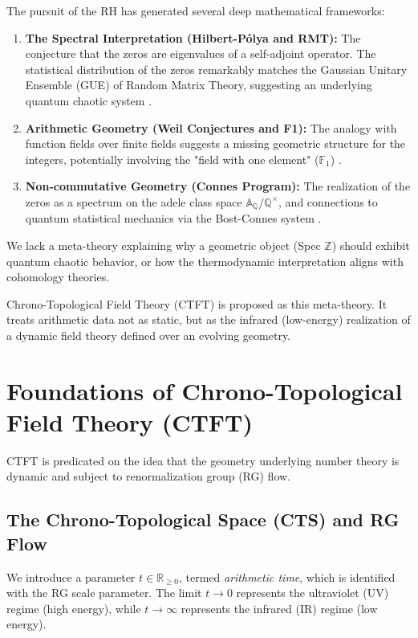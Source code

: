 \documentclass[11pt, a4paper]{article}
\theoremstyle{definition}
\newcommand{\Z}{\mathbb{Z}}
\newcommand{\Q}{\mathbb{Q}}
\newcommand{\R}{\mathbb{R}}
\newcommand{\A}{\mathbb{A}}
\newcommand{\F}{\mathbb{F}_1}
\begin{document}
The pursuit of the RH has generated several deep mathematical frameworks:
\begin{enumerate}
    \item \textbf{The Spectral Interpretation (Hilbert-Pólya and RMT):} The conjecture that the zeros are eigenvalues of a self-adjoint operator. The statistical distribution of the zeros remarkably matches the Gaussian Unitary Ensemble (GUE) of Random Matrix Theory, suggesting an underlying quantum chaotic system \cite{Montgomery1973, Berry1999}.
    \item \textbf{Arithmetic Geometry (Weil Conjectures and F1):} The analogy with function fields over finite fields suggests a missing geometric structure for the integers, potentially involving the "field with one element" ($\F$) \cite{Deligne1974}.
    \item \textbf{Non-commutative Geometry (Connes Program):} The realization of the zeros as a spectrum on the adele class space $\A_\Q/\Q^\times$, and connections to quantum statistical mechanics via the Bost-Connes system \cite{Bost1995, Connes1999}.
\end{enumerate}

We lack a meta-theory explaining why a geometric object (Spec $\Z$) should exhibit quantum chaotic behavior, or how the thermodynamic interpretation aligns with cohomology theories.

Chrono-Topological Field Theory (CTFT) is proposed as this meta-theory. It treats arithmetic data not as static, but as the infrared (low-energy) realization of a dynamic field theory defined over an evolving geometry.

\section{Foundations of Chrono-Topological Field Theory (CTFT)}
CTFT is predicated on the idea that the geometry underlying number theory is dynamic and subject to renormalization group (RG) flow.

\subsection{The Chrono-Topological Space (CTS) and RG Flow}
We introduce a parameter $t \in \R_{\geq 0}$, termed \textit{arithmetic time}, which is identified with the RG scale parameter. The limit $t\to 0$ represents the ultraviolet (UV) regime (high energy), while $t\to\infty$ represents the infrared (IR) regime (low energy).
\end{document}
